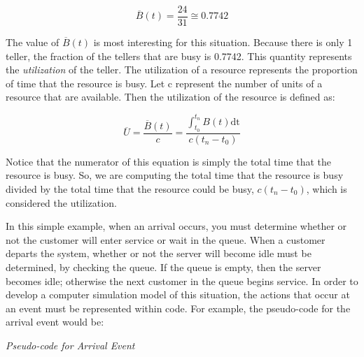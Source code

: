 \documentclass[
]{book}
\theoremstyle{definition}
\theoremstyle{definition}
\theoremstyle{definition}
\theoremstyle{definition}
\theoremstyle{remark}
\begin{document}
\[\overline{B}\left( t \right) = \frac{24}{31} \cong 0.7742\]

The value of \(\overline{B}\left( t \right)\) is most interesting for this
situation. Because there is only 1 teller, the fraction of the tellers
that are busy is 0.7742. This quantity represents the \emph{utilization} of
the teller. The utilization of a resource represents the proportion of
time that the resource is busy. Let c represent the number of units of a
resource that are available. Then the utilization of the
resource is defined as:

\[\overline{U} = \frac{\overline{B}\left( t \right)}{c} = \frac{\int_{t_{0}}^{t_{n}}{B\left( t \right)\text{dt}}}{c(t_{n} - t_{0})}\]

Notice that the numerator of this equation is simply the total time that
the resource is busy. So, we are computing the total time that the
resource is busy divided by the total time that the resource could be
busy, \(c(t_{n} - t_{0})\), which is considered the utilization.

In this simple example, when an arrival occurs, you must determine
whether or not the customer will enter service or wait in the queue.
When a customer departs the system, whether or not the server will
become idle must be determined, by checking the queue. If the queue is
empty, then the server becomes idle; otherwise the next customer in the
queue begins service. In order to develop a computer simulation model of
this situation, the actions that occur at an event must be represented
within code. For example, the pseudo-code for the arrival event would
be:

\emph{Pseudo-code for Arrival Event}
\end{document}
